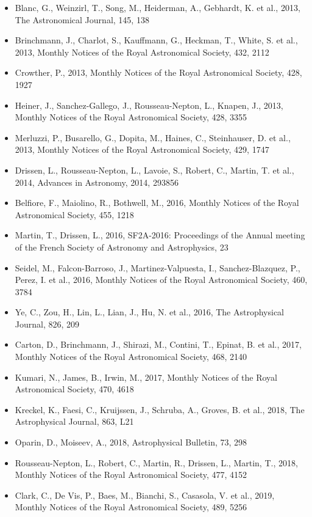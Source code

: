 \documentclass{letter}
\begin{document}
\begin{enumerate}
\begin{itemize}
\item Blanc, G., Weinzirl, T., Song, M., Heiderman, A., Gebhardt, K. et al., 2013, The Astronomical Journal, 145, 138
\item Brinchmann, J., Charlot, S., Kauffmann, G., Heckman, T., White, S. et al., 2013, Monthly Notices of the Royal Astronomical Society, 432, 2112
\item Crowther, P., 2013, Monthly Notices of the Royal Astronomical Society, 428, 1927
\item Heiner, J., Sanchez-Gallego, J., Rousseau-Nepton, L., Knapen, J., 2013, Monthly Notices of the Royal Astronomical Society, 428, 3355
\item Merluzzi, P., Busarello, G., Dopita, M., Haines, C., Steinhauser, D. et al., 2013, Monthly Notices of the Royal Astronomical Society, 429, 1747
\item Drissen, L., Rousseau-Nepton, L., Lavoie, S., Robert, C., Martin, T. et al., 2014, Advances in Astronomy, 2014, 293856
\item Belfiore, F., Maiolino, R., Bothwell, M., 2016, Monthly Notices of the Royal Astronomical Society, 455, 1218
\item Martin, T., Drissen, L., 2016, SF2A-2016: Proceedings of the Annual meeting of the French Society of Astronomy and Astrophysics, 23
\item Seidel, M., Falcon-Barroso, J., Martinez-Valpuesta, I., Sanchez-Blazquez, P., Perez, I. et al., 2016, Monthly Notices of the Royal Astronomical Society, 460, 3784
\item Ye, C., Zou, H., Lin, L., Lian, J., Hu, N. et al., 2016, The Astrophysical Journal, 826, 209
\item Carton, D., Brinchmann, J., Shirazi, M., Contini, T., Epinat, B. et al., 2017, Monthly Notices of the Royal Astronomical Society, 468, 2140
\item Kumari, N., James, B., Irwin, M., 2017, Monthly Notices of the Royal Astronomical Society, 470, 4618
\item Kreckel, K., Faesi, C., Kruijssen, J., Schruba, A., Groves, B. et al., 2018, The Astrophysical Journal, 863, L21
\item Oparin, D., Moiseev, A., 2018, Astrophysical Bulletin, 73, 298
\item Rousseau-Nepton, L., Robert, C., Martin, R., Drissen, L., Martin, T., 2018, Monthly Notices of the Royal Astronomical Society, 477, 4152
\item Clark, C., De Vis, P., Baes, M., Bianchi, S., Casasola, V. et al., 2019, Monthly Notices of the Royal Astronomical Society, 489, 5256

\end{itemize}
\end{enumerate}
\end{document}
